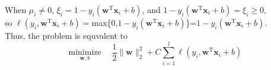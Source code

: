 \documentclass[a4paper]{article}
\begin{document}
\begin{enumerate}
\begin{enumerate}
  When $\mu_i\neq0$, $\xi_{i}= 1- y_{i}\left(\boldsymbol{w}^{\mathrm{T}} \boldsymbol{x}_{i}+b\right)$, and $1- y_{i}\left(\boldsymbol{w}^{\mathrm{T}} \boldsymbol{x}_{i}+b\right) = \xi_i \geq 0$,\\ 
  so $\ell\left(y_{i}, \boldsymbol{w}^{\mathrm{T}} \boldsymbol{x}_{i}+b\right)=$max\{0,$1- y_{i}\left(\boldsymbol{w}^{\mathrm{T}} \boldsymbol{x}_{i}+b\right)$\}=$1- y_{i}\left(\boldsymbol{w}^{\mathrm{T}} \boldsymbol{x}_{i}+b\right)$.\\
  Thus, the problem is equvalent to
  \begin{equation*}
    \underset{\boldsymbol{w}, b}{\operatorname{minimize}} \quad \frac{1}{2}\|\boldsymbol{w}\|_{2}^{2}+C \sum_{i=1}^{l} \ell\left(y_{i}, \boldsymbol{w}^{\mathrm{T}} \boldsymbol{x}_{i}+b\right)
  \end{equation*}






\end{enumerate}
\end{enumerate}
\end{document}
